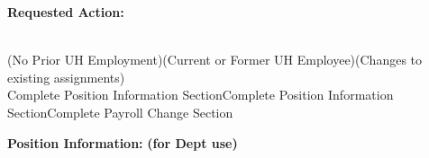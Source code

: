 \documentclass{article}
\newenvironment{temp}
{}
{}
\begin{document}
\begin{tcolorbox}[standard jigsaw, opacityback=0]
    \begin{temp}
        \LARGE\textbf{Requested Action:}
    \end{temp}
    \large
    \begin{Form}

    {}%
    \hspace{4cm}
    \hspace{4cm} 
    \end{Form}
    \\
    \scriptsize
    \hspace{-0.2cm}(No Prior UH Employment)\hspace{3.3cm}(Current or Former UH Employee)\hspace{3.5cm}(Changes to existing assignments)\\
    Complete Position Information Section\hspace{2cm}Complete Position Information Section\hspace{3cm}Complete Payroll Change Section
\end{tcolorbox}
\begin{tcolorbox}[standard jigsaw, opacityback=0]
    \vspace{-0.2cm}
    \LARGE
    \textbf{Position Information:}
    \normalsize
    \hspace{9cm}\textbf{(for Dept use)}\vspace{-0.2cm}
\end{tcolorbox}

\vspace{-0.6cm}
\end{document}

